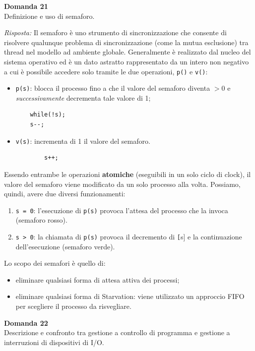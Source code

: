 \documentclass{article}
\newenvironment{problem}[2][Domanda]
    { \begin{mdframed}[backgroundcolor=gray!20] \textbf{#1 #2} \\}
    {  \end{mdframed}}
\newenvironment{solution}
    {\textit{Risposta:}}
    {}
\begin{document}
\begin{problem}{21}
Definizione e uso di semaforo.
\end{problem}
\begin{solution}
Il semaforo è uno strumento di sincronizzazione che consente di risolvere qualunque problema di sincronizzazione (come la mutua esclusione) tra thread nel modello ad ambiente globale.
\newline
Generalmente è realizzato dal nucleo del sistema operativo ed è un dato astratto rappresentato da un intero non negativo a cui è possibile accedere solo tramite le due operazioni, \texttt{p()} e \texttt{v()}:
\begin{itemize}
    \item \texttt{p(s)}: blocca il processo fino a che il valore del semaforo diventa $> 0$ e \textit{successivamente} decrementa tale valore di 1;
\begin{verbatim}
    while(!s);
    s--;
\end{verbatim}
\item \texttt{v(s)}: incrementa di 1 il valore del semaforo.
    \begin{verbatim}
        s++;
    \end{verbatim}
\end{itemize}
Essendo entrambe le operazioni \textbf{atomiche} (eseguibili in un solo ciclo di clock), il valore del semaforo viene modificato da un solo processo alla volta.
Possiamo, quindi, avere due diversi funzionamenti:
\begin{enumerate}
    \item \texttt{s = 0}: l’esecuzione di \texttt{p(s)} provoca l’attesa del processo che la invoca (semaforo rosso).
    \item \texttt{s > 0}: la chiamata di \texttt{p(s)} provoca il decremento di \texttt[s] e la continuazione dell’esecuzione (semaforo verde).
\end{enumerate}
Lo scopo dei semafori è quello di:
\begin{itemize}
    \item eliminare qualsiasi forma di attesa attiva dei processi;
    \item eliminare qualsiasi forma di Starvation: viene utilizzato un approccio FIFO per scegliere il processo da risvegliare.
\end{itemize}
\end{solution}
\begin{problem}{22}
Descrizione e confronto tra gestione a controllo di programma e gestione a interruzioni di dispositivi di I/O.
\end{problem}
\end{document}
